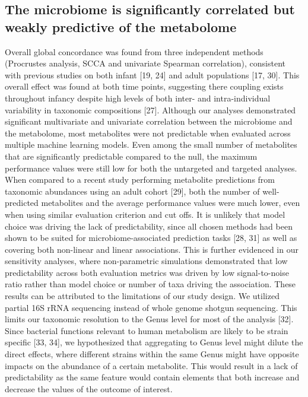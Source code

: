 \subsection{The microbiome is significantly correlated but weakly predictive of the metabolome}
Overall global concordance was found from three independent methods (Procrustes analysis, SCCA and univariate Spearman correlation), consistent with previous studies on both infant [19, 24] and adult populations [17, 30]. This overall effect was found at both time points, suggesting there coupling exists throughout infancy despite high levels of both inter- and intra-individual variability in taxonomic compositions [27]. 
Although our analyses demonstrated significant multivariate and univariate correlation between the microbiome and the metabolome, most metabolites were not predictable when evaluated across multiple machine learning models. Even among the small number of metabolites that are significantly predictable compared to the null, the maximum performance values were still low for both the untargeted and targeted analyses. When compared to a recent study performing metabolite predictions from taxonomic abundances using an adult cohort [29], both the number of well-predicted metabolites and the average performance values were much lower, even when using similar evaluation criterion and cut offs. It is unlikely that model choice was driving the lack of predictability, since all chosen methods had been shown to be suited for microbiome-associated prediction tasks [28, 31] as well as covering both non-linear and linear associations. This is further evidenced in our sensitivity analyses, where non-parametric simulations demonstrated that low predictability across both evaluation metrics was driven by low signal-to-noise ratio rather than model choice or number of taxa driving the association.
These results can be attributed to the limitations of our study design. We utilized partial 16S rRNA sequencing instead of whole genome shotgun sequencing. This limits our taxonomic resolution to the Genus level for most of the analysis [32]. Since bacterial functions relevant to human metabolism are likely to be strain specific [33, 34], we hypothesized that aggregating to Genus level might dilute the direct effects, where different strains within the same Genus might have opposite impacts on the abundance of a certain metabolite. This would result in a lack of predictability as the same feature would contain elements that both increase and decrease the values of the outcome of interest.  
